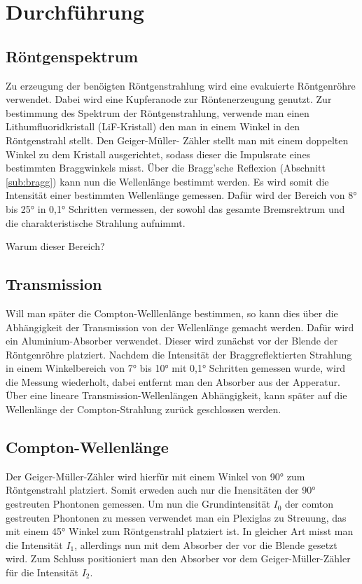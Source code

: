\newpage
\section{Durchführung}
\subsection{Röntgenspektrum}
Zu erzeugung der benöigten Röntgenstrahlung wird eine evakuierte Röntgenröhre verwendet.
Dabei wird eine Kupferanode zur Röntenerzeugung genutzt.
Zur bestimmung des Spektrum der Röntgenstrahlung, verwende man einen Lithumfluoridkristall 
(LiF-Kristall) den man in einem Winkel in den Röntgenstrahl stellt. Den Geiger-Müller-
Zähler stellt man mit einem doppelten Winkel zu dem Kristall ausgerichtet, sodass dieser
die Impulsrate eines bestimmten Braggwinkels misst. Über die Bragg'sche Reflexion (Abschnitt \ref{sub:bragg})
kann nun die Wellenlänge bestimmt werden. Es wird somit die Intensität einer bestimmten Wellenlänge gemessen.
Dafür wird der Bereich von 8° bis 25° in 0,1° Schritten vermessen, der sowohl das
gesamte Bremsrektrum und die charakteristische Strahlung aufnimmt.

Warum dieser Bereich?
\subsection{Transmission}
Will man später die Compton-Welllenlänge bestimmen, so kann dies über die 
Abhängigkeit der Transmission von der Wellenlänge gemacht werden. Dafür wird
ein Aluminium-Absorber verwendet. Dieser wird zunächst vor der Blende der Röntgenröhre 
platziert. Nachdem die Intensität der Braggreflektierten Strahlung in einem Winkelbereich
von 7° bis 10° mit 0,1° Schritten gemessen wurde, wird die Messung wiederholt, dabei 
entfernt man den Absorber aus der Apperatur.
Über eine lineare Transmission-Wellenlängen Abhängigkeit, kann später auf die Wellenlänge
der Compton-Strahlung zurück geschlossen werden.

\subsection{Compton-Wellenlänge}
Der Geiger-Müller-Zähler wird hierfür mit einem Winkel von 90° zum 
Röntgenstrahl platziert. Somit erweden auch nur die Inensitäten der 90° 
gestreuten Phontonen gemessen.
Um nun die Grundintensität $I_0$ der comton gestreuten Phontonen zu messen
verwendet man ein Plexiglas zu Streuung, das mit einem 45° Winkel zum Röntgenstrahl
platziert ist. In gleicher Art misst man die Intensität $I_1$, 
allerdings nun mit dem Absorber der vor die Blende gesetzt wird.
Zum Schluss positioniert man den Absorber vor dem Geiger-Müller-Zähler für
die Intensität $I_2$.

